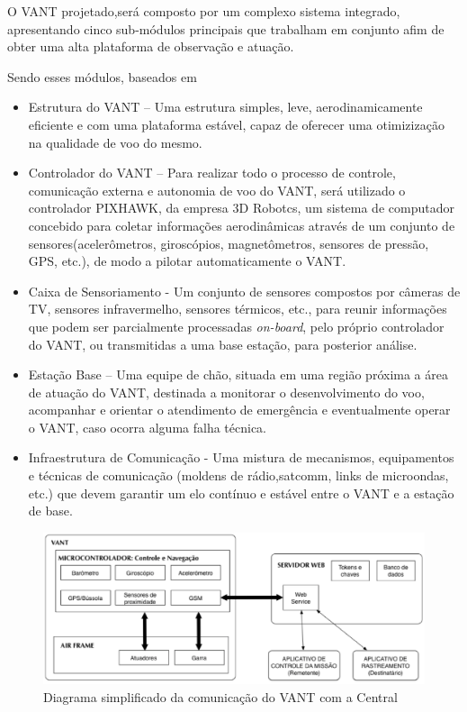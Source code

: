 O VANT projetado,será composto por um complexo sistema integrado, apresentando cinco sub-módulos principais  que trabalham em conjunto afim de obter uma alta plataforma de observação e atuação.

Sendo esses módulos, baseados em \cite{pastor}

\begin{itemize}
	\item Estrutura do VANT – Uma estrutura simples, leve, aerodinamicamente eficiente e com uma plataforma estável, capaz de oferecer uma otimizização na qualidade de voo do mesmo. 
	\item Controlador do VANT – Para realizar todo o processo de controle, comunicação externa e autonomia de voo do VANT, será utilizado o controlador PIXHAWK, da empresa 3D Robotcs, um sistema de computador concebido para coletar informações aerodinâmicas através de um conjunto de sensores(acelerômetros, giroscópios, magnetômetros, sensores de pressão, GPS, etc.), de modo a pilotar automaticamente o VANT.
	\item Caixa de Sensoriamento - Um conjunto de sensores compostos por câmeras de TV, sensores infravermelho, sensores térmicos, etc., para reunir informações que podem ser parcialmente processadas \textit{on-board}, pelo próprio controlador do VANT, ou transmitidas a uma base estação, para posterior análise.
	\item Estação Base – Uma equipe de chão, situada em uma região próxima a área de atuação do VANT, destinada a monitorar o desenvolvimento do voo, acompanhar e orientar o atendimento de emergência e eventualmente operar o VANT, caso ocorra alguma falha técnica. 
	\item Infraestrutura de Comunicação - Uma mistura de mecanismos, equipamentos e técnicas de comunicação (moldens de rádio,satcomm, links de microondas, etc.) que devem garantir um elo contínuo e estável entre o VANT e a estação de base. 
\end{itemize}


\begin{figure}[h!]
	\centering
	  \includegraphics[keepaspectratio=true,scale=0.6]{figuras/diagrama.eps}
	\caption{Diagrama simplificado da comunicação do VANT com a Central}
	\label{fig:diagrama}
\end{figure}


